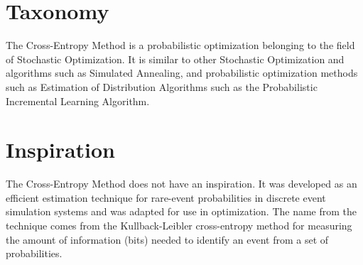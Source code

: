 \documentclass[a4paper, 11pt]{article}
\begin{document}
\section{Taxonomy}
\label{sec:taxonomy}
The Cross-Entropy Method is a probabilistic optimization belonging to the field of Stochastic Optimization.
It is similar to other Stochastic Optimization and algorithms such as Simulated Annealing, and probabilistic optimization methods such as Estimation of Distribution Algorithms such as the Probabilistic Incremental Learning Algorithm.

\section{Inspiration}
\label{sec:inspiration}
The Cross-Entropy Method does not have an inspiration. It was developed as an efficient estimation technique for rare-event probabilities in discrete event simulation systems and was adapted for use in optimization.
The name from the technique comes from the Kullback-Leibler cross-entropy method for measuring the amount of information (bits) needed to identify an event from a set of probabilities.
\end{document}
